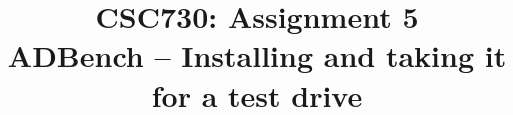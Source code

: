 \documentclass[conference]{IEEEtran}
\begin{document}
\title{CSC730: Assignment 5\\ADBench – Installing and taking it for a test drive

}



\maketitle

%






%

\printbibliography{}

\vspace{12pt}
\end{document}
